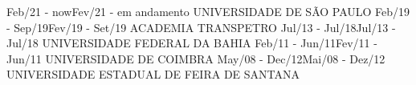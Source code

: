               {Feb/21 - now}{Fev/21 - em andamento}
              {UNIVERSIDADE DE SÃO PAULO}
              {Feb/19 - Sep/19}{Fev/19 - Set/19}
              {ACADEMIA TRANSPETRO}
              {Jul/13 - Jul/18}{Jul/13 - Jul/18}
              {UNIVERSIDADE FEDERAL DA BAHIA}
              {Feb/11 - Jun/11}{Fev/11 - Jun/11}
              {UNIVERSIDADE DE COIMBRA}
              {May/08 - Dec/12}{Mai/08 - Dez/12}
              {UNIVERSIDADE ESTADUAL DE FEIRA DE SANTANA}
